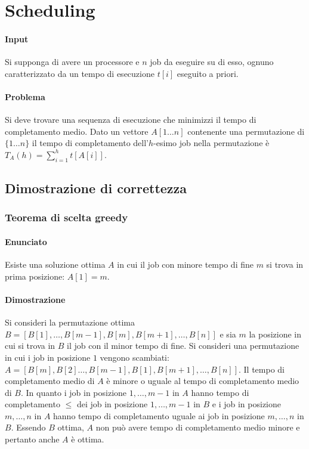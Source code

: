 	\section{Scheduling}
	\paragraph{Input}
	Si supponga di avere un processore e $n$ job da eseguire su di esso, ognuno caratterizzato da un tempo di esecuzione $t[i]$ eseguito a priori.
	\paragraph{Problema}
	Si deve trovare una sequenza di esecuzione che minimizzi il tempo di completamento medio. Dato un vettore $A[1\dots n]$ contenente una permutazione di $\{1\dots n\}$ il tempo di 
	completamento dell'$h$-esimo job nella permutazione \`e $T_A(h) = \sum\limits_{i = 1}^h t[A[i]]$. 
	\subsection{Dimostrazione di correttezza}
	\subsubsection{Teorema di scelta greedy}
	\paragraph{Enunciato}
	Esiste una soluzione ottima $A$ in cui il job con minore tempo di fine $m$ si trova in prima posizione: $A[1] = m$.
	\paragraph{Dimostrazione}
	Si consideri la permutazione ottima $B = [B[1], \dots, B[m-1], B[m], B[m+1], \dots, B[n]]$ e sia $m$ la posizione in cui si trova in $B$ il job con il minor tempo di fine. Si consideri
	una permutazione in cui i job in posizione $1$ vengono scambiati: $A =[B[m], B[2] \dots, B[m-1], B[1], B[m+1], \dots, B[n]]$. Il tempo di completamento medio di $A$ \`e minore o uguale
	al tempo di completamento medio di $B$. In quanto i job in posizione $1, \dots, m-1$ in $A$ hanno tempo di completamento $\le$ dei job in posizione $1, \dots, m-1$ in $B$ e i job in
	posizione $m, \dots, n$ in $A$ hanno tempo di completamento uguale ai job in posizione $m, \dots, n$ in $B$. Essendo $B$ ottima, $A$ non pu\`o avere tempo di completamento medio minore
	e pertanto anche $A$ \`e ottima. 
